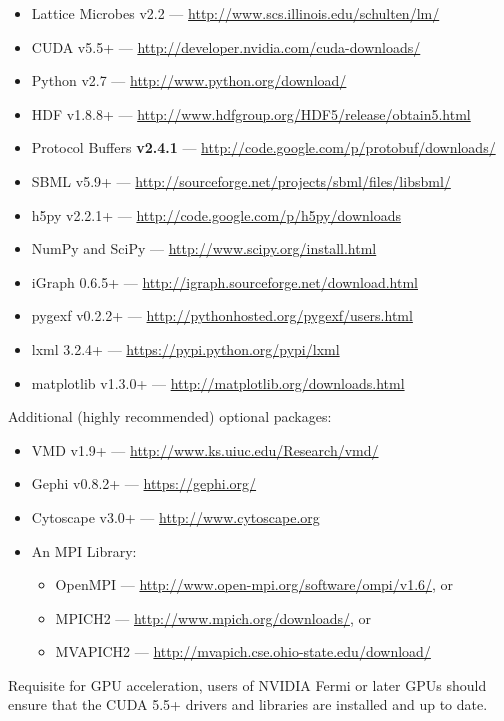 \begin{itemize}[noitemsep]
\item Lattice Microbes v2.2 --- \url{http://www.scs.illinois.edu/schulten/lm/}
\item CUDA v5.5+ --- \url{http://developer.nvidia.com/cuda-downloads/}
\item Python v2.7 --- \url{http://www.python.org/download/}
\item HDF v1.8.8+ --- \url{http://www.hdfgroup.org/HDF5/release/obtain5.html}
\item Protocol Buffers \textbf{v2.4.1} --- \url{http://code.google.com/p/protobuf/downloads/}
\item SBML v5.9+ --- \url{http://sourceforge.net/projects/sbml/files/libsbml/}
\item h5py v2.2.1+ --- \url{http://code.google.com/p/h5py/downloads}
\item NumPy and SciPy --- \url{http://www.scipy.org/install.html}
\item iGraph 0.6.5+ --- \url{http://igraph.sourceforge.net/download.html}
\item pygexf v0.2.2+ --- \url{http://pythonhosted.org/pygexf/users.html}
\item lxml 3.2.4+ --- \url{https://pypi.python.org/pypi/lxml}
\item matplotlib v1.3.0+ --- \url{http://matplotlib.org/downloads.html}
\end{itemize}

Additional (highly recommended) optional packages:

\begin{itemize}[noitemsep]
\item VMD v1.9+ --- \url{http://www.ks.uiuc.edu/Research/vmd/}
\item Gephi v0.8.2+ --- \url{https://gephi.org/}
\item Cytoscape v3.0+ --- \url{http://www.cytoscape.org}
\item An MPI Library:
\begin{itemize}[noitemsep]
\item OpenMPI --- \url{http://www.open-mpi.org/software/ompi/v1.6/}, or
\item MPICH2 --- \url{http://www.mpich.org/downloads/}, or
\item MVAPICH2 --- \url{http://mvapich.cse.ohio-state.edu/download/}
 \end{itemize}
\end{itemize}

Requisite for GPU acceleration, users of NVIDIA Fermi or later GPUs should ensure that the CUDA 5.5+ drivers and libraries are installed and up to date.  \\

